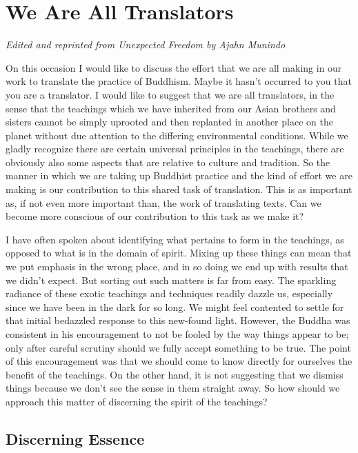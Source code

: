 \chapter{We Are All Translators}

\emph{Edited and reprinted from \emph{Unexpected Freedom}\cite{unexpected} by Ajahn Munindo}

On this occasion I would like to discuss the effort that we are all
making in our work to translate the practice of Buddhism. Maybe it
hasn't occurred to you that you are a translator. I would like to
suggest that we are all translators, in the sense that the teachings
which we have inherited from our Asian brothers and sisters cannot be
simply uprooted and then replanted in another place on the planet
without due attention to the differing environmental conditions. While
we gladly recognize there are certain universal principles in the
teachings, there are obviously also some aspects that are relative to
culture and tradition. So the manner in which we are taking up Buddhist
practice and the kind of effort we are making is our contribution to
this shared task of translation. This is as important as, if not even
more important than, the work of translating texts. Can we become more
conscious of our contribution to this task as we make it?

I have often spoken about identifying what pertains to form in the
teachings, as opposed to what is in the domain of spirit. Mixing up
these things can mean that we put emphasis in the wrong place, and in so
doing we end up with results that we didn't expect. But sorting out such
matters is far from easy. The sparkling radiance of these exotic
teachings and techniques readily dazzle us, especially since we have
been in the dark for so long. We might feel contented to settle for that
initial bedazzled response to this new-found light. However, the Buddha
was consistent in his encouragement to not be fooled by the way things
appear to be; only after careful scrutiny should we fully accept
something to be true. The point of this encouragement was that we should
come to know directly for ourselves the benefit of the teachings. On the
other hand, it is not suggesting that we dismiss things because we don't
see the sense in them straight away. So how should we approach this
matter of discerning the spirit of the teachings?

\section{Discerning Essence}

